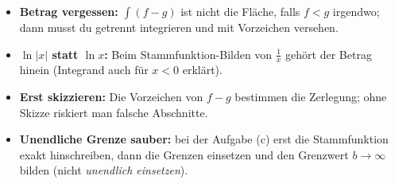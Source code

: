 \begin{achtung}
\begin{itemize}
  \item \textbf{Betrag vergessen:} $\int(f-g)$ ist nicht die Fläche, falls
        $f<g$ irgendwo; dann musst du getrennt integrieren und mit
        Vorzeichen versehen.
  \item \textbf{$\ln|x|$ statt $\ln x$:} Beim Stammfunktion-Bilden von
        $\frac1x$ gehört der Betrag hinein (Integrand auch für $x<0$
        erklärt).
  \item \textbf{Erst skizzieren:} Die Vorzeichen von $f-g$ bestimmen die
        Zerlegung; ohne Skizze riskiert man falsche Abschnitte.
  \item \textbf{Unendliche Grenze sauber:} bei der Aufgabe (c) erst die
        Stammfunktion exakt hinschreiben, dann die Grenzen einsetzen und
        den Grenzwert $b\to\infty$ bilden (nicht \emph{unendlich einsetzen}).
\end{itemize}
\end{achtung}

